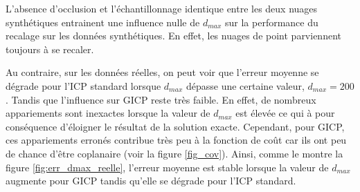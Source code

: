 L'absence d'occlusion et l'échantillonnage identique entre les deux nuages synthétiques entrainent une influence nulle de $d_{max}$ sur la performance du recalage sur les données synthétiques. En effet, les nuages de point parviennent toujours à se recaler.

Au contraire, sur les données réelles, on peut voir que l'erreur moyenne se dégrade pour l'ICP standard lorsque $d_{max}$ dépasse une certaine valeur, $d_{max}=200$. Tandis que l'influence sur GICP reste très faible. En effet, de nombreux appariements sont inexactes lorsque la valeur de $d_{max}$ est élevée ce qui à pour conséquence d'éloigner le résultat de la solution exacte. Cependant, pour GICP, ces appariements erronés contribue très peu à la fonction de coût car ils ont peu de chance d'être coplanaire (voir la figure \ref{fig_cov}). Ainsi, comme le montre la figure \ref{fig:err_dmax_reelle}, l'erreur moyenne est stable lorsque la valeur de $d_{max}$ augmente pour GICP tandis qu'elle se dégrade pour l'ICP standard.

